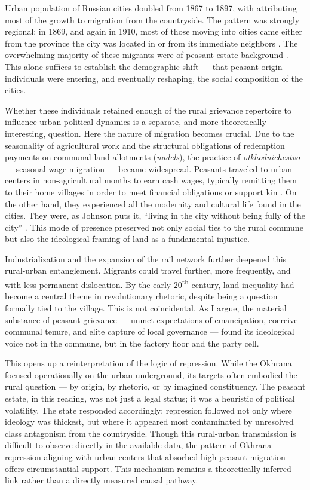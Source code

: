\documentclass[11pt]{scrarticle}
\begin{document}
Urban population of Russian cities doubled from 1867 to 1897, with \cite{gatrell_tsarist_1986} attributing most of the growth to migration from the countryside. The pattern was strongly regional: in 1869, and again in 1910, most of those moving into cities came either from the province the city was located in or from its immediate neighbors \parencite{gatrell_tsarist_1986}. The overwhelming majority of these migrants were of peasant estate background \parencite{fauser_engines_2021}. This alone suffices to establish the demographic shift — that peasant-origin individuals were entering, and eventually reshaping, the social composition of the cities.

Whether these individuals retained enough of the rural grievance repertoire to influence urban political dynamics is a separate, and more theoretically interesting, question. Here the nature of migration becomes crucial. Due to the seasonality of agricultural work and the structural obligations of redemption payments on communal land allotments (\textit{nadels}), the practice of \textit{otkhodnichestvo} — seasonal wage migration — became widespread. Peasants traveled to urban centers in non-agricultural months to earn cash wages, typically remitting them to their home villages in order to meet financial obligations or support kin \parencite{fauser_engines_2021}. On the other hand, they experienced all the modernity and cultural life found in the cities. They were, as Johnson puts it, ``living in the city without being fully of the city'' \parencite{johnson_paradigms_2010}. This mode of presence preserved not only social ties to the rural commune but also the ideological framing of land as a fundamental injustice. 

Industrialization and the expansion of the rail network further deepened this rural-urban entanglement. Migrants could travel further, more frequently, and with less permanent dislocation. By the early 20\textsuperscript{th} century, land inequality had become a central theme in revolutionary rhetoric, despite being a question formally tied to the village. This is not coincidental. As I argue, the material substance of peasant grievance — unmet expectations of emancipation, coercive communal tenure, and elite capture of local governance — found its ideological voice not in the commune, but in the factory floor and the party cell.

This opens up a reinterpretation of the logic of repression. While the Okhrana focused operationally on the urban underground, its targets often embodied the rural question — by origin, by rhetoric, or by imagined constituency. The peasant estate, in this reading, was not just a legal status; it was a heuristic of political volatility. The state responded accordingly: repression followed not only where ideology was thickest, but where it appeared most contaminated by unresolved class antagonism from the countryside. Though this rural-urban transmission is difficult to observe directly in the available data, the pattern of Okhrana repression aligning with urban centers that absorbed high peasant migration offers circumstantial support. This mechanism remains a theoretically inferred link rather than a directly measured causal pathway.
\end{document}
